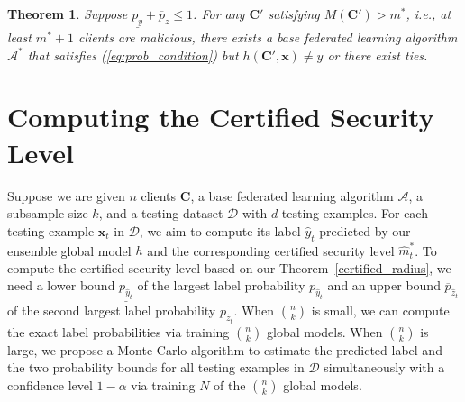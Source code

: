 \documentclass[letterpaper]{article} %
\newtheorem{theorem}{Theorem}
\begin{document}
\begin{theorem}
\label{tightness_theorem}
Suppose $\underline{p_y} + \overline{p}_z \le 1$. For any $\mathbf{C'}$ satisfying $M(\mathbf{C'})>m^*$, i.e., at least $m^*+1$ clients are malicious, there exists a base federated learning algorithm $\mathcal{A}^*$ that satisfies (\ref{eq:prob_condition}) but $h(\mathbf{C'}, \mathbf{x}) \neq y$ or there exist ties.
\end{theorem}


\section{Computing the Certified Security Level}
Suppose we are given $n$ clients $\mathbf{C}$, a base federated learning algorithm $\mathcal{A}$, a subsample size $k$, and a testing dataset $\mathcal{D}$ with $d$ testing examples. For each testing example $\mathbf{x}_t$ in $\mathcal{D}$, we aim to compute its label $\hat{y}_t$ predicted by our ensemble global model $h$ and the corresponding certified security level $\hat{m}_t^*$. To compute the certified security level based on our Theorem~\ref{certified_radius}, we need a lower bound $\underline{p_{\hat{y}_t}}$ of the largest label probability ${p_{\hat{y}_t}}$ and an upper bound $\overline{p}_{\hat{z}_t}$ of the second largest label probability ${p}_{\hat{z}_t}$. When ${n \choose k}$ is small, we can compute the exact label probabilities via training ${n \choose k}$ global models.  When ${n \choose k}$ is large, we propose a Monte Carlo algorithm to  estimate the predicted label and the two probability bounds for all testing examples in $\mathcal{D}$ simultaneously with a confidence level $1-\alpha$ via training $N$ of the ${n \choose k}$ global models.
\end{document}
